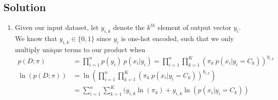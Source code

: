 \documentclass[submit]{harvardml}
\begin{document}
\subsection*{Solution}
\begin{enumerate}
    \item Given our input dataset, let $y_{i,k}$ denote the $k^{th}$ element of output vector $y_i$. We know that $y_{i,k} \in \{0, 1\}$ since $y_i$ is one-hot encoded, such that we only multiply unique terms to our product when 
    \begin{align}
        p(D; \pi) &= \prod_{i=1}^n p(y_i) \ p(x_i | y_i)  = \prod_{i=1}^n \prod_{k=1}^K (\pi_k \ p(x_i | y_i = C_k))^{y_{i,k}} \\
        \ln(p(D; \pi)) &= \ln(\prod_{i=1}^n \prod_{k=1}^K (\pi_k \ p(x_i | y_i = C_k))^{y_{i,k}}) \\
        &= \sum_{i=1}^n \sum_{k=1}^K (y_{i,k}\ln(\pi_k) + y_{i,k}\ln(p(x_i | y_i = C_k))
    \end{align}
    

\end{enumerate}
\end{document}
